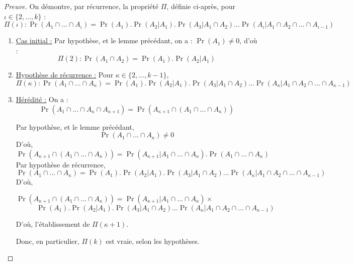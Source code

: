 \begin{proof}[Preuve]
On démontre, par récurrence, 
la propriété $\Pi$, définie ci-après, pour 
$\iota\in\{2, ..., k\}$ :
$$
\Pi(\iota) : 
\Pr(A_1\cap...\cap A_\iota) =
\Pr(A_1) . \Pr(A_2|A_1) . \Pr(A_3|A_1\cap A_2)
...
\Pr(A_\iota|A_1\cap A_2\cap...\cap A_{\iota-1})
$$

\begin{enumerate}
\item \underline{Cas initial :}
Par hypothèse, et 
le lemme précédant, on a : $\Pr(A_1)\not=0$, d'où :
$$
\Pi(2) : 
\Pr(A_1\cap A_2) =
\Pr(A_1) . \Pr(A_2|A_1)
$$

\item \underline{Hypothèse de récurrence :}
Pour $\kappa \in \{2, ..., k-1\}$, 
$$\Pi(\kappa) : 
\Pr(A_1\cap...\cap A_\kappa) =
\Pr(A_1) . \Pr(A_2|A_1) . \Pr(A_3|A_1\cap A_2)
...
\Pr(A_\kappa|A_1\cap A_2\cap...\cap A_{\kappa-1})
$$

\item \underline{Hérédité :}
On a :
$$\Pr(A_1\cap...\cap A_\kappa \cap A_{\kappa+1})
=
\Pr(A_{\kappa+1} \cap (A_1\cap...\cap A_\kappa))
$$

Par hypothèse, et
le lemme précédant, 
$$\Pr(A_1\cap...\cap A_\kappa) \not=0$$
D'où, 
$$
\Pr(A_{\kappa+1} \cap (A_1\cap...\cap A_\kappa))
=
\Pr(A_{\kappa+1} | A_1\cap...\cap A_\kappa) .
\Pr(A_1\cap...\cap A_\kappa)
$$
Par hypothèse de récurrence, 
$$
\Pr(A_1\cap...\cap A_\kappa) =
\Pr(A_1) . \Pr(A_2|A_1) . \Pr(A_3|A_1\cap A_2)
...
\Pr(A_\kappa|A_1\cap A_2\cap...\cap A_{\kappa-1})
$$
D'où, 

$
\Pr(A_{\kappa+1} \cap (A_1\cap...\cap A_\kappa))
=
\Pr(A_{\kappa+1} | A_1\cap...\cap A_\kappa) \times
$
\\
$~~~~~~~~~~~~~
\Pr(A_1) . \Pr(A_2|A_1) . \Pr(A_3|A_1\cap A_2)
...
\Pr(A_\kappa|A_1\cap A_2\cap...\cap A_{\kappa-1})
$

D'où, l'établissement de $\Pi(\kappa+1)$.

Donc, en particulier, $\Pi(k)$ est vraie, selon les hypothèses.
\end{enumerate}
\end{proof}

